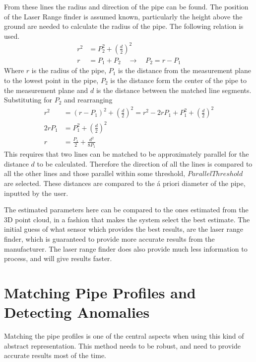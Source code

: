 From these lines the radius and direction of the pipe can be found. The position of the
Laser Range finder is assumed known, particularly the height above the ground are needed
to calculate the radius of the pipe. The following relation is used.
\begin{align}
    r^2 &= P_2^2 + \left(\frac{d}{2} \right)^2 \\
    r &= P_1 + P_2  \quad \rightarrow \quad P_2 = r - P_1
\end{align}
Where $r$ is the radius of the pipe, $P_1$ is the distance from the measurement plane to
the lowest point in the pipe, $P_2$ is the distance form the center of the pipe to the
measurement plane and $d$ is the distance between the matched line segments. Substituting
for $P_2$ and rearranging
\begin{equation}
    \begin{aligned}
        r^2& = (r - P_1)^2 + \left(\frac{d}{2}\right)^2 = r^2 - 2 r P_1 + P_1^2 +
        \left(\frac{d}{2}\right)^2 \\
        2 r P_1 &= P_1^2 + \left(\frac{d}{2}\right)^2 \\
        r &= \frac{P_1}{2} + \frac{d^2}{8 P_1}
    \end{aligned}
\end{equation}
This requires that two lines can be matched to be approximately parallel for the distance
$d$ to be calculated. Therefore the direction of all the lines is compared to all the
other lines and those parallel within some threshold, $ParallelThreshold$ are selected.
These distances are compared to the \'a priori diameter of the pipe, inputted by the user. 

The estimated parameters here can be compared to the ones estimated from the 3D point
cloud, in a fashion that makes the system select the best estimate. The initial guess of
what sensor which provides the best results, are the laser range finder, which is
guaranteed to provide more accurate results from the manufacturer. The laser range finder
does also provide much less information to process, and will give results faster. 


\section{Matching Pipe Profiles and Detecting Anomalies}
Matching the pipe profiles is one of the central aspects when using this kind of abstract
representation. This method needs to be robust, and need to provide accurate results most
of the time.

